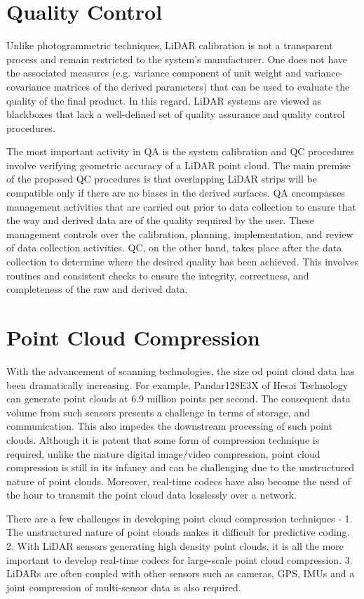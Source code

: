\documentclass[a4paper, 11pt, twocolumn]{article}
\begin{document}
\section{Quality Control}
Unlike photogrammetric techniques, LiDAR calibration is not a transparent process and remain restricted to the system's manufacturer. One does not have the associated measures (e.g. variance component of unit weight and variance-covariance matrices of the derived parameters) that can be used to evaluate the quality of the final product. In this regard, LiDAR systems are viewed as blackboxes that lack a well-defined set of quality assurance and quality control procedures.

The most important activity in QA is the system calibration and QC procedures involve verifying geometric accuracy of a LiDAR point cloud. The main premise of the proposed QC procedures is that overlapping LiDAR strips will be compatible only if there are no biases in the derived surfaces. QA encompasses management activities that are carried out prior to data collection to ensure that the way and derived data are of the quality required by the user. These management controls over the calibration, planning, implementation, and review of data collection activities. QC, on the other hand, takes place after the data collection to determine where the desired quality has been achieved. This involves routines and consistent checks to ensure the integrity, correctness, and completeness of the raw and derived data.




\section{Point Cloud Compression}
With the advancement of scanning technologies, the size od point cloud data has been dramatically increasing. For example, Pandar128E3X of Hesai Technology can generate point clouds at 6.9 million points per second. The consequent data volume from such sensors presents a challenge in terms of storage, and communication. This also impedes the downstream processing of such point clouds. Although it is patent that some form of compression technique is required, unlike the mature digital image/video compression, point cloud compression is still in its infancy and can be challenging due to the unstructured nature of point clouds. Moreover, real-time codecs have also become the need of the hour to transmit the point cloud data losslessly over a network.

There are a few challenges in developing point cloud compression techniques - 1. The unstructured nature of point clouds makes it difficult for predictive coding. 2. With LiDAR sensors generating high density point clouds, it is all the more important to develop real-time codecs for large-scale point cloud compression. 3. LiDARs are often coupled with other sensors such as cameras, GPS, IMUs and a joint compression of multi-sensor data is also required.
\end{document}
